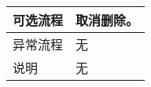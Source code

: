 \begin{table}[htbp]
\begin{tabular}{|l|l|l|l|}
        可选流程                          & \multicolumn{3}{l|}{取消删除。}                                                                                                                                                         \\
        \hline
        异常流程                          & \multicolumn{3}{l|}{无}                                                                                                                                                                 \\
        \hline
        说明                              & \multicolumn{3}{l|}{无}                                                                                                                                                                 \\
        \hline
    \end{tabular}
\end{table}

